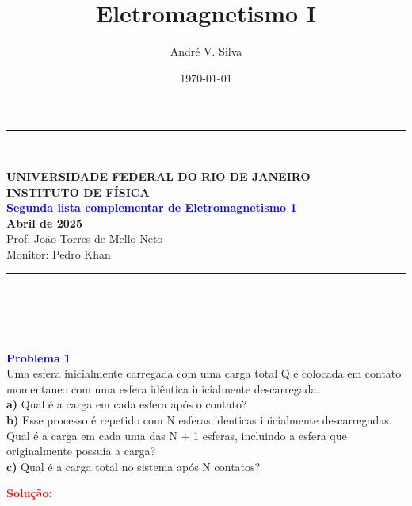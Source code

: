 \documentclass[a4paper,12pt]{article}
\title{ \textbf{\large Eletromagnetismo I }}
\author{Andr\'e V. Silva}
\date{\today}
\newcommand{\printingbibliography}{%

    \pagestyle{myheadings}
    \markright{}
    \sloppy
    \printbibliography[heading=bibintoc, %
                   title=Refer\^encias %
                  ]
    \fussy%
}
\begin{document}
\noindent\rule{\linewidth}{0.8pt}\\
\begin{center}
    \textbf{UNIVERSIDADE FEDERAL DO RIO DE JANEIRO}\\
    \textbf{INSTITUTO DE FÍSICA}\\
    \textbf{\textcolor{blue}{Segunda lista complementar de Eletromagnetismo 1}}\\
    \textbf{Abril de 2025}\\
    \vspace{0.5cm}
    Prof. João Torres de Mello Neto\\
    Monitor: Pedro Khan
\end{center}
\noindent\rule{\linewidth}{0.8pt}\\
\maketitle


\noindent\rule{\linewidth}{0.4pt}\\

\justifying

\begin{flushleft}
\textbf{\textcolor{blue}{\Large Problema 1}}\\
Uma esfera inicialmente carregada com uma carga total Q e colocada em
contato momentaneo com uma esfera id\^entica inicialmente descarregada. \\
\textbf{a)} Qual \'e a carga em cada esfera ap\'os o contato?\\
\textbf{b)} Esse processo \'e repetido com N esferas identicas inicialmente descarregadas. 
Qual \'e a carga em cada uma das N + 1 esferas, incluindo a esfera que originalmente possuia a carga?\\
\textbf{c)} Qual \'e a carga total no sistema ap\'os N contatos?
\end{flushleft}

\textcolor{red}{\textbf{Solução:}}\\


\end{document}
